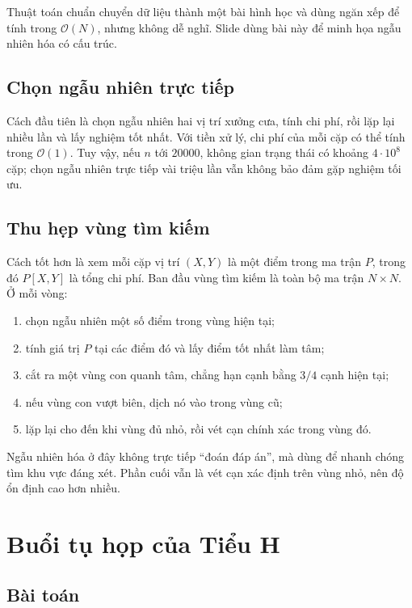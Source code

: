 \documentclass[11pt]{article}
\newcommand{\Oh}{\mathcal{O}}
\begin{document}
Thuật toán chuẩn chuyển dữ liệu thành một bài hình học và dùng ngăn xếp để
tính trong \(\Oh(N)\), nhưng không dễ nghĩ. Slide dùng bài này để minh họa
ngẫu nhiên hóa có cấu trúc.

\subsection{Chọn ngẫu nhiên trực tiếp}

Cách đầu tiên là chọn ngẫu nhiên hai vị trí xưởng cưa, tính chi phí, rồi lặp
lại nhiều lần và lấy nghiệm tốt nhất. Với tiền xử lý, chi phí của mỗi cặp có
thể tính trong \(\Oh(1)\). Tuy vậy, nếu \(n\) tới \(20000\), không gian trạng
thái có khoảng \(4\cdot 10^8\) cặp; chọn ngẫu nhiên trực tiếp vài triệu lần
vẫn không bảo đảm gặp nghiệm tối ưu.

\subsection{Thu hẹp vùng tìm kiếm}

Cách tốt hơn là xem mỗi cặp vị trí \((X,Y)\) là một điểm trong ma trận \(P\),
trong đó \(P[X,Y]\) là tổng chi phí. Ban đầu vùng tìm kiếm là toàn bộ ma trận
\(N\times N\). Ở mỗi vòng:
\begin{enumerate}
  \item chọn ngẫu nhiên một số điểm trong vùng hiện tại;
  \item tính giá trị \(P\) tại các điểm đó và lấy điểm tốt nhất làm tâm;
  \item cắt ra một vùng con quanh tâm, chẳng hạn cạnh bằng \(3/4\) cạnh hiện
  tại;
  \item nếu vùng con vượt biên, dịch nó vào trong vùng cũ;
  \item lặp lại cho đến khi vùng đủ nhỏ, rồi vét cạn chính xác trong vùng đó.
\end{enumerate}

Ngẫu nhiên hóa ở đây không trực tiếp ``đoán đáp án'', mà dùng để nhanh chóng
tìm khu vực đáng xét. Phần cuối vẫn là vét cạn xác định trên vùng nhỏ, nên độ
ổn định cao hơn nhiều.

\section{Buổi tụ họp của Tiểu H}

\subsection{Bài toán}
\end{document}
